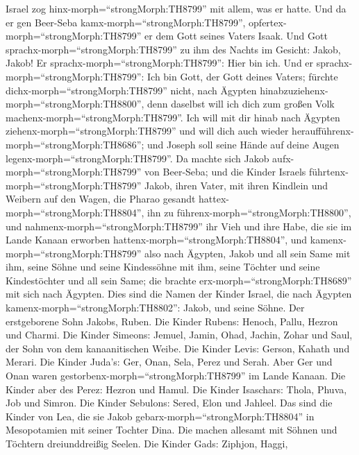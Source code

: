  Israel zog hinx-morph=``strongMorph:TH8799'' mit allem, was
er hatte. Und da er gen Beer-Seba kamx-morph=``strongMorph:TH8799'',
opfertex-morph=``strongMorph:TH8799'' er dem Gott seines Vaters Isaak.
 Und Gott sprachx-morph=``strongMorph:TH8799'' zu ihm des
Nachts im Gesicht: Jakob, Jakob! Er
sprachx-morph=``strongMorph:TH8799'': Hier bin ich.  Und er
sprachx-morph=``strongMorph:TH8799'': Ich bin Gott, der Gott deines
Vaters; fürchte dichx-morph=``strongMorph:TH8799'' nicht, nach Ägypten
hinabzuziehenx-morph=``strongMorph:TH8800'', denn daselbst will ich dich
zum großen Volk machenx-morph=``strongMorph:TH8799''.  Ich
will mit dir hinab nach Ägypten ziehenx-morph=``strongMorph:TH8799'' und
will dich auch wieder heraufführenx-morph=``strongMorph:TH8686''; und
Joseph soll seine Hände auf deine Augen
legenx-morph=``strongMorph:TH8799''.  Da machte sich Jakob
aufx-morph=``strongMorph:TH8799'' von Beer-Seba; und die Kinder Israels
führtenx-morph=``strongMorph:TH8799'' Jakob, ihren Vater, mit ihren
Kindlein und Weibern auf den Wagen, die Pharao gesandt
hattex-morph=``strongMorph:TH8804'', ihn zu
führenx-morph=``strongMorph:TH8800'',  und
nahmenx-morph=``strongMorph:TH8799'' ihr Vieh und ihre Habe, die sie im
Lande Kanaan erworben hattenx-morph=``strongMorph:TH8804'', und
kamenx-morph=``strongMorph:TH8799'' also nach Ägypten, Jakob und all
sein Same mit ihm,  seine Söhne und seine Kindessöhne mit
ihm, seine Töchter und seine Kindestöchter und all sein Same; die
brachte erx-morph=``strongMorph:TH8689'' mit sich nach Ägypten.
 Dies sind die Namen der Kinder Israel, die nach Ägypten
kamenx-morph=``strongMorph:TH8802'': Jakob, und seine Söhne. Der
erstgeborene Sohn Jakobs, Ruben.  Die Kinder Rubens: Henoch,
Pallu, Hezron und Charmi.  Die Kinder Simeons: Jemuel,
Jamin, Ohad, Jachin, Zohar und Saul, der Sohn von dem kanaanitischen
Weibe.  Die Kinder Levis: Gerson, Kahath und Merari.
 Die Kinder Juda's: Ger, Onan, Sela, Perez und Serah. Aber
Ger und Onan waren gestorbenx-morph=``strongMorph:TH8799'' im Lande
Kanaan. Die Kinder aber des Perez: Hezron und Hamul.  Die
Kinder Isaschars: Thola, Phuva, Job und Simron.  Die Kinder
Sebulons: Sered, Elon und Jahleel.  Das sind die Kinder von
Lea, die sie Jakob gebarx-morph=``strongMorph:TH8804'' in Mesopotamien
mit seiner Tochter Dina. Die machen allesamt mit Söhnen und Töchtern
dreiunddreißig Seelen.  Die Kinder Gads: Ziphjon, Haggi,
